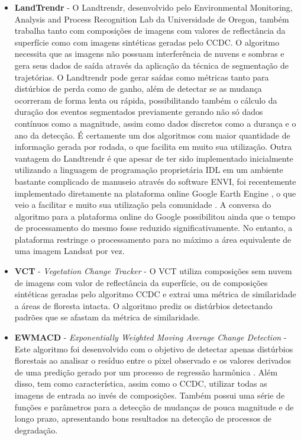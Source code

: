 \begin{itemize}
  \item \textbf{LandTrendr} \citep{KENNEDY20102897, KENNEDY2012117} - O Landtrendr, desenvolvido pelo Environmental Monitoring, Analysis and Process Recognition Lab da Universidade de Oregon, também trabalha tanto com composições de imagens com valores de reflectância da superfície como com imagens sintéticas geradas pelo CCDC. O algoritmo necessita que as imagens não possuam interferência de nuvens e sombras e gera seus dados de saída através da aplicação da técnica de segmentação de trajetórias. O Landtrendr pode gerar saídas como métricas tanto para distúrbios de perda como de ganho, além de detectar se as mudança ocorreram de forma lenta ou rápida, possibilitando também o cálculo da duração dos eventos segmentados previamente gerando não só dados contínuos como a magnitude, assim como dados discretos como a durança e o ano da detecção. É certamente um dos algoritmos com maior quantidade de informação gerada por rodada, o que facilita em muito sua utilização. Outra vantagem do Landtrendr é que apesar de ter sido implementado inicialmente utilizando a linguagem de programação proprietária IDL em um ambiente bastante complicado de manuseio através do software ENVI, foi recentemente implementado diretamente na plataforma online Google Earth Engine \citep{GORELICK201718}, o que veio a facilitar e muito sua utilização pela comunidade \citep{Kennedy2018}. A conversa do algoritmo para a plataforma online do Google possibilitou ainda que o tempo de processamento do mesmo fosse reduzido significativamente. No entanto, a plataforma restringe o processamento para no máximo a área equivalente de uma imagem Landsat por vez.
  
  \item \textbf{VCT} - \textit{Vegetation Change Tracker} \citep{Huang2010, THOMAS201119} - O VCT utiliza composições sem nuvem de imagens com valor de reflectância da superfície, ou de composições sintéticas geradas pelo algoritmo CCDC e extrai uma métrica de similaridade a áreas de floresta intacta. O algoritmo prediz os distúrbios detectando padrões que se afastam da métrica de similaridade.
  
  \item \textbf{EWMACD} - \textit{Exponentially Weighted Moving Average Change Detection} \citep{Brooks2014} - Este algoritmo foi desenvolvido com o objetivo de detectar apenas distúrbios florestais ao analisar o resíduo entre o pixel observado e os valores derivados de uma predição gerado por um processo de regressão harmônica \citep{Brooks2012}. Além disso, tem como característica, assim como o CCDC, utilizar todas as imagens de entrada ao invés de composições. Também possui uma série de funções e parâmetros para a detecção de mudanças de pouca magnitude e de longo prazo, apresentando bons resultados na detecção de processos de degradação.
  

\end{itemize}
